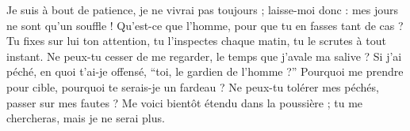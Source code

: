 \lettrine{J}{}e suis à bout de patience, je ne vivrai pas toujours ; laisse-moi donc : mes jours ne sont qu’un souffle !
Qu’est-ce que l’homme, pour que tu en fasses tant de cas ? Tu fixes sur lui ton attention,
tu l’inspectes chaque matin, tu le scrutes à tout instant.
Ne peux-tu cesser de me regarder, le temps que j’avale ma salive ? Si j’ai péché, en quoi t’ai-je offensé, “toi, le gardien de l’homme ?” Pourquoi me prendre pour cible, pourquoi te serais-je un fardeau ?
Ne peux-tu tolérer mes péchés, passer sur mes fautes ? Me voici bientôt étendu dans la poussière ; tu me chercheras, mais je ne serai plus.